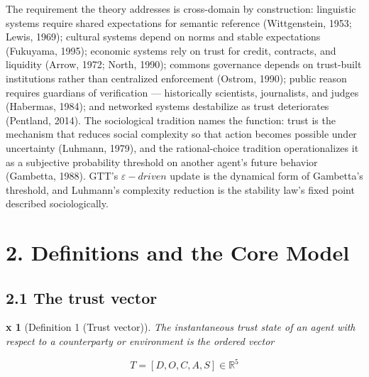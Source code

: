 \documentclass[11pt,twocolumn]{article}
\theoremstyle{gttdef}
\newtheorem*{gttdef}{x}
\theoremstyle{gttplain}
\begin{document}
The requirement the theory addresses is cross-domain by construction: linguistic systems require shared expectations for semantic reference (Wittgenstein, 1953; Lewis, 1969); cultural systems depend on norms and stable expectations (Fukuyama, 1995); economic systems rely on trust for credit, contracts, and liquidity (Arrow, 1972; North, 1990); commons governance depends on trust-built institutions rather than centralized enforcement (Ostrom, 1990); public reason requires guardians of verification --- historically scientists, journalists, and judges (Habermas, 1984); and networked systems destabilize as trust deteriorates (Pentland, 2014). The sociological tradition names the function: trust is the mechanism that reduces social complexity so that action becomes possible under uncertainty (Luhmann, 1979), and the rational-choice tradition operationalizes it as a subjective probability threshold on another agent's future behavior (Gambetta, 1988). GTT's $\varepsilon-driven$ update is the dynamical form of Gambetta's threshold, and Luhmann's complexity reduction is the stability law's fixed point described sociologically.

\section*{2. Definitions and the Core Model}

\subsection*{2.1 The trust vector}

\begin{gttdef}[{Definition 1 (Trust vector)}]

The instantaneous trust state of an agent with respect to a counterparty or environment is the ordered vector

\end{gttdef}

\begin{equation}
T = [D, O, C, A, S] \in \mathbb{R}^{5}
\label{eq:trustvec}
\end{equation}
\end{document}
